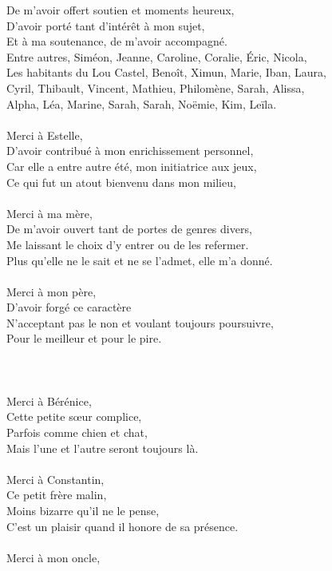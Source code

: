 \documentclass[english,a4paper,11pt,twoside]{StyleThese}
\begin{document}
De m'avoir offert soutien et moments heureux,\\
D'avoir porté tant d'intérêt à mon sujet,\\
Et à ma soutenance, de m'avoir accompagné.\\
Entre autres, Siméon, Jeanne, Caroline, Coralie, Éric, Nicola,\\
Les habitants  du Lou Castel, Benoît, Ximun, Marie, Iban, Laura,\\
Cyril, Thibault, Vincent, Mathieu,  Philomène, Sarah, Alissa,\\
Alpha, Léa, Marine, Sarah, Sarah, Noëmie, Kim, Leïla.\\
\\
Merci à Estelle,\\
D'avoir contribué à mon enrichissement personnel,\\
Car elle a entre autre été, mon initiatrice aux jeux,\\
Ce qui fut un atout bienvenu dans mon milieu,\\
\\
Merci à ma mère,\\
De m'avoir ouvert tant de portes de genres divers,\\
Me laissant le choix d'y entrer ou de les refermer.\\
Plus qu'elle ne le sait et ne se l'admet, elle m'a donné.\\
\\
Merci à mon père,\\
D'avoir forgé ce caractère\\
N'acceptant pas le non et voulant toujours poursuivre,\\
Pour le meilleur et pour le pire.\\
\\
\\
\\
Merci à Bérénice,\\
Cette petite s\oe{}ur complice,\\
Parfois comme chien et chat,\\
Mais l'une et l'autre seront toujours là.\\
\\
Merci à Constantin,\\
Ce petit frère malin,\\
Moins bizarre qu'il ne le pense,\\
C'est un plaisir quand il honore de sa présence.\\
\\
Merci à mon oncle,\\
\end{document}
